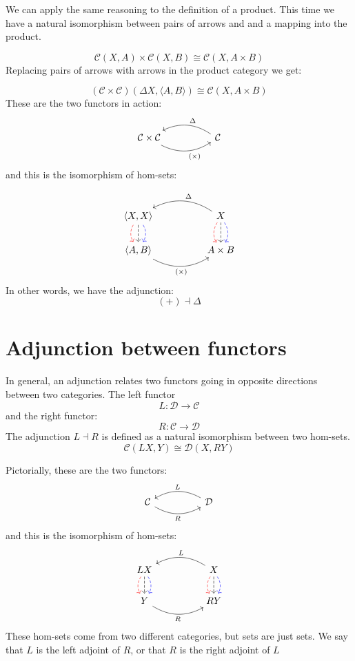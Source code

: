 \documentclass[DaoFP]{subfiles}
\begin{document}
We can apply the same reasoning to the definition of a product. This time we have a natural isomorphism between pairs of arrows and and a mapping into the product.

\[  \mathcal{C} (X, A) \times \mathcal{C}(X, B) \cong  \mathcal{C} (X, A \times B)  \]
Replacing pairs of arrows with arrows in the product category we get:

\[  (\mathcal{C} \times \mathcal{C})( \Delta X,  \langle A, B \rangle ) \cong  \mathcal{C} (X, A \times B)  \]
These are the two functors in action:
\[
 \begin{tikzcd}
  \mathcal{C} \times \mathcal{C}
  \arrow[rr, bend right, "(\times)"']
  &&
  \mathcal{C}
  \arrow[ll, bend right, "\Delta"']
  \end{tikzcd}
\]
and this is the isomorphism of hom-sets:

\[
 \begin{tikzcd}
 \langle X, X \rangle
\arrow[d, bend right, red, dashed]
\arrow[d, dashed]
\arrow[d, bend left, blue, dashed]
  &&
  X
\arrow[d, bend right, red, dashed]
\arrow[d, dashed]
\arrow[d, bend left, blue, dashed]
 \arrow[ll, bend right, "\Delta"']
 \\
 \langle A , B \rangle
   \arrow[rr, bend right, "(\times)"']
 &&
 A \times B
  \end{tikzcd}
\]
In other words, we have the adjunction:
\[ (+) \dashv \Delta \]


\section{Adjunction between functors}

In general, an adjunction relates two functors going in opposite directions between two categories. The left functor 
\[ L \colon \mathcal{D} \to \mathcal{C}\]
and the right functor:
\[ R \colon \mathcal{C} \to  \mathcal{D} \]
The adjunction $L \dashv R$ is defined as a natural isomorphism between two hom-sets.
\[  \mathcal{C} (L X, Y) \cong \mathcal{D}( X , R Y)\]

Pictorially, these are the two functors:
\[
 \begin{tikzcd}
  \mathcal{C}
  \arrow[rr, bend right, "R"']
  &&
  \mathcal{D}
  \arrow[ll, bend right, "L"']
  \end{tikzcd}
\]
and this is the isomorphism of hom-sets:
\[
 \begin{tikzcd}
L X
\arrow[d, bend right, red, dashed]
\arrow[d, dashed]
\arrow[d, bend left, blue, dashed]
  &&
  X
\arrow[d, bend right, red, dashed]
\arrow[d, dashed]
\arrow[d, bend left, blue, dashed]
 \arrow[ll, bend right, "L"']
 \\
Y
   \arrow[rr, bend right, "R"']
 &&
 R Y
  \end{tikzcd}
\]
 These hom-sets come from two different categories, but sets are just sets. We say that $L$ is the left adjoint of $R$, or that $R$ is the right adjoint of $L$
\end{document}
